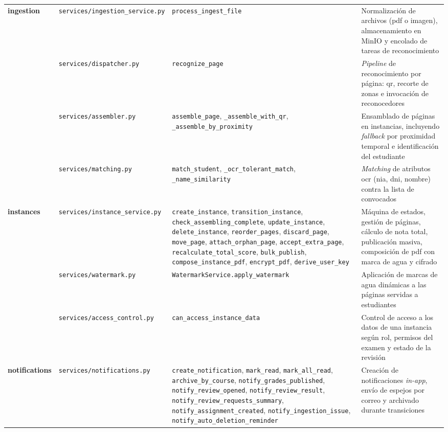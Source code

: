 \begin{longtable}{p{1.8cm} p{3.2cm} p{4.5cm} p{4.5cm}}
\textbf{ingestion}
& \texttt{services/ingestion\_service.py}
& \texttt{process\_ingest\_file}
& Normalización de archivos (\acs{pdf} o imagen), almacenamiento en MinIO y encolado de tareas de reconocimiento \\

& \texttt{services/dispatcher.py}
& \texttt{recognize\_page}
& \textit{Pipeline} de reconocimiento por página: \acs{qr}, recorte de zonas e invocación de reconocedores \\

& \texttt{services/assembler.py}
& \texttt{assemble\_page}, \texttt{\_assemble\_with\_qr}, \texttt{\_assemble\_by\_proximity}
& Ensamblado de páginas en instancias, incluyendo \textit{fallback} por proximidad temporal e identificación del estudiante \\

& \texttt{services/matching.py}
& \texttt{match\_student}, \texttt{\_ocr\_tolerant\_match}, \texttt{\_name\_similarity}
& \textit{Matching} de atributos \acs{ocr} (\acs{nia}, \acs{dni}, nombre) contra la lista de convocados \\

\textbf{instances}
& \texttt{services/instance\_service.py}
& \texttt{create\_instance}, \texttt{transition\_instance}, \texttt{check\_assembling\_complete}, \texttt{update\_instance}, \texttt{delete\_instance}, \texttt{reorder\_pages}, \texttt{discard\_page}, \texttt{move\_page}, \texttt{attach\_orphan\_page}, \texttt{accept\_extra\_page}, \texttt{recalculate\_total\_score}, \texttt{bulk\_publish}, \texttt{compose\_instance\_pdf}, \texttt{encrypt\_pdf}, \texttt{derive\_user\_key}
& Máquina de estados, gestión de páginas, cálculo de nota total, publicación masiva, composición de \acs{pdf} con marca de agua y cifrado \\

& \texttt{services/watermark.py}
& \texttt{WatermarkService.apply\_watermark}
& Aplicación de marcas de agua dinámicas a las páginas servidas a estudiantes \\

& \texttt{services/access\_control.py}
& \texttt{can\_access\_instance\_data}
& Control de acceso a los datos de una instancia según rol, permisos del examen y estado de la revisión \\

\textbf{notifications}
& \texttt{services/notifications.py}
& \texttt{create\_notification}, \texttt{mark\_read}, \texttt{mark\_all\_read}, \texttt{archive\_by\_course}, \texttt{notify\_grades\_published}, \texttt{notify\_review\_opened}, \texttt{notify\_review\_result}, \texttt{notify\_review\_requests\_summary}, \texttt{notify\_assignment\_created}, \texttt{notify\_ingestion\_issue}, \texttt{notify\_auto\_deletion\_reminder}
& Creación de notificaciones \textit{in-app}, envío de espejos por correo y archivado durante transiciones \\


\end{longtable}
